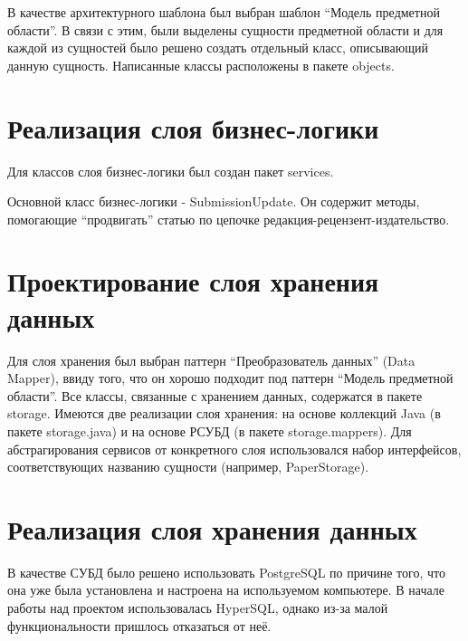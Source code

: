 В качестве архитектурного шаблона был выбран шаблон ``Модель предметной
области''. В связи с этим, были выделены сущности предметной области и
для каждой из сущностей было решено создать отдельный класс, описывающий
данную сущность. Написанные классы расположены в пакете objects.

\section{Реализация слоя
бизнес-логики}\label{ux440ux435ux430ux43bux438ux437ux430ux446ux438ux44f-ux441ux43bux43eux44f-ux431ux438ux437ux43dux435ux441-ux43bux43eux433ux438ux43aux438}

Для классов слоя бизнес-логики был создан пакет services.

Основной класс бизнес-логики - SubmissionUpdate. Он содержит методы,
помогающие ``продвигать'' статью по цепочке
редакция-рецензент-издательство.

\section{Проектирование слоя хранения
данных}\label{ux43fux440ux43eux435ux43aux442ux438ux440ux43eux432ux430ux43dux438ux435-ux441ux43bux43eux44f-ux445ux440ux430ux43dux435ux43dux438ux44f-ux434ux430ux43dux43dux44bux445}

Для слоя хранения был выбран паттерн ``Преобразователь данных'' (Data
Mapper), ввиду того, что он хорошо подходит под паттерн ``Модель
предметной области''. Все классы, связанные с хранением данных,
содержатся в пакете storage. Имеются две реализации слоя хранения: на
основе коллекций Java (в пакете storage.java) и на основе РСУБД (в
пакете storage.mappers). Для абстрагирования сервисов от конкретного
слоя использовался набор интерфейсов, соответствующих названию сущности
(например, PaperStorage).

\section{Реализация слоя хранения
данных}\label{ux440ux435ux430ux43bux438ux437ux430ux446ux438ux44f-ux441ux43bux43eux44f-ux445ux440ux430ux43dux435ux43dux438ux44f-ux434ux430ux43dux43dux44bux445}

В качестве СУБД было решено использовать PostgreSQL по причине того, что
она уже была установлена и настроена на используемом компьютере. В
начале работы над проектом использовалась HyperSQL, однако из-за малой
функциональности пришлось отказаться от неё.

